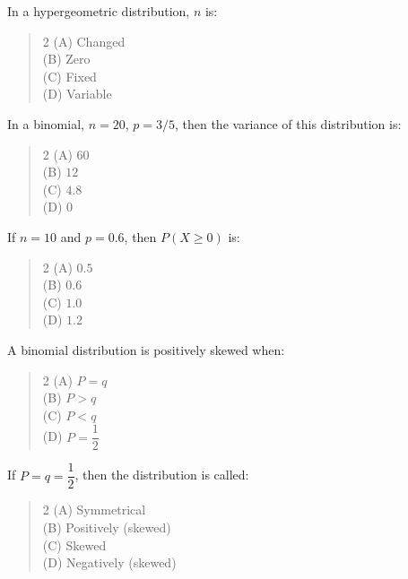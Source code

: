 \documentclass[11pt,a4paper]{article}
\begin{document}
\begin{mcqlist}
\item In a hypergeometric distribution, $n$ is:
\begin{quote}\begin{multicols}{2}
\noindent (A) Changed \\
(B) Zero \\
(C) Fixed \\
(D) Variable
\end{multicols}\end{quote}

\item In a binomial, $n=20$, $p=3/5$, then the variance of this distribution is:
\begin{quote}\begin{multicols}{2}
\noindent (A) $60$ \\
(B) $12$ \\
(C) $4.8$ \\
(D) $0$
\end{multicols}\end{quote}

\item If $n=10$ and $p=0.6$, then $P(X\geq 0)$ is:
\begin{quote}\begin{multicols}{2}
\noindent (A) $0.5$ \\
(B) $0.6$ \\
(C) $1.0$ \\
(D) $1.2$
\end{multicols}\end{quote}

\item A binomial distribution is positively skewed when:
\begin{quote}\begin{multicols}{2}
\noindent (A) $P=q$ \\
(B) $P>q$ \\
(C) $P<q$ \\
(D) $P=\dfrac{1}{2}$
\end{multicols}\end{quote}

\item If $P=q=\dfrac{1}{2}$, then the distribution is called:
\begin{quote}\begin{multicols}{2}
\noindent (A) Symmetrical \\
(B) Positively (skewed) \\
(C) Skewed \\
(D) Negatively (skewed)
\end{multicols}\end{quote}


\end{mcqlist}
\end{document}
